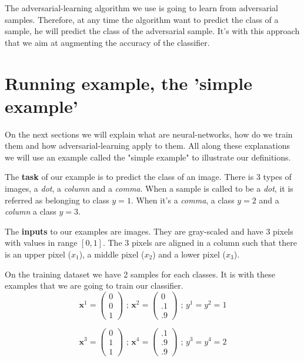 		The adversarial-learning algorithm we use is going to learn from adversarial samples. Therefore, at any time the algorithm want to predict the class of a sample, he will predict the class of the adversarial sample. It's with this approach that we aim at augmenting the accuracy of the classifier.


	\section{Running example, the 'simple example'}
		On the next sections we will explain what are neural-networks, how do we train them and how adversarial-learning apply to them. All along these explanations we will use an example called the "simple example" to illustrate our definitions.


		The \textbf{task} of our example is to predict the class of an image. There is 3 types of images, a \textit{dot}, a \textit{column} and a \textit{comma}. When a sample is called to be a \textit{dot}, it is referred as belonging to class $y=1$. When it's a \textit{comma}, a class $y=2$ and a \textit{column} a class $y=3$.

		The \textbf{inputs} to our examples are images. They are gray-scaled and have 3 pixels with values in range $[0,1]$. The 3 pixels are aligned in a column such that there is an upper pixel ($x_1$), a middle pixel ($x_2$) and a lower pixel ($x_3$). 

		On the training dataset we have 2 samples for each classes. It is with these examples that we are going to train our classifier.
		$$ \boldsymbol{x}^1 = \left( \begin{matrix} 0  \\ 0  \\ 1  \end{matrix}\right) \text{ ; }
		   \boldsymbol{x}^2 = \left( \begin{matrix} 0  \\ .1 \\ .9 \end{matrix}\right) \text{ ; }
		   y^1 = y^2 = 1 $$

		$$ \boldsymbol{x}^3 = \left( \begin{matrix} 0  \\ 1  \\ 1  \end{matrix}\right) \text{ ; }
		   \boldsymbol{x}^4 = \left( \begin{matrix} .1 \\ .9 \\ .9 \end{matrix}\right) \text{ ; }
		   y^3 = y^4 = 2 $$

